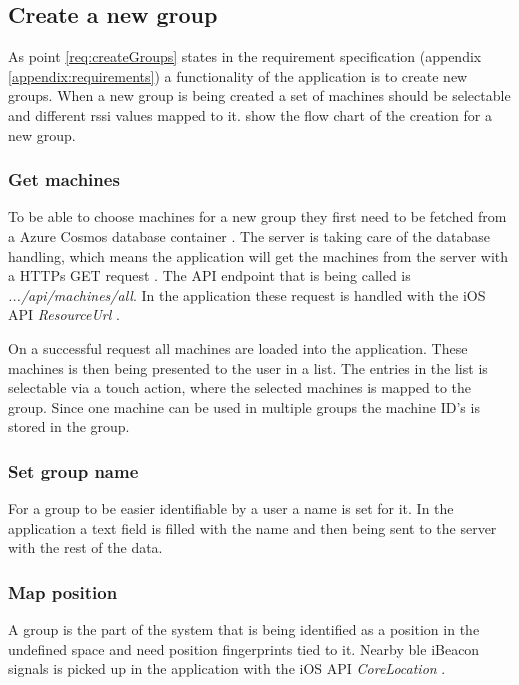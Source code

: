 \subsection{Create a new group}\label{sec:implAppNewGroup}

As point \ref{req:createGroups} states in the requirement specification (appendix \ref{appendix:requirements}) a functionality of the application is to create new groups.
When a new group is being created a set of machines should be selectable and different \acrshort{rssi} values mapped to it.
 show the flow chart of the creation for a new group.


\subsubsection{Get machines}\label{sec:implAppNewGroupGetMachines}
To be able to choose machines for a new group they first need to be fetched from a Azure Cosmos database container \cite{IntroductionAzureCosmos}.
The server is taking care of the database handling, which means the application will get the machines from the server with a HTTPs GET request \cite{GETHTTPMDN}.
The API endpoint that is being called is \textit{.../api/machines/all}.
In the application these request is handled with the iOS API \textit{ResourceUrl} \cite{ResourceURLAppleDeveloper}.

\bigskip

On a successful request all machines are loaded into the application.
These machines is then being presented to the user in a list.
The entries in the list is selectable via a touch action, where the selected machines is mapped to the group.
Since one machine can be used in multiple groups the machine ID's is stored in the group.


\subsubsection{Set group name}\label{sec:implAppNewGroupSetName}
For a group to be easier identifiable by a user a name is set for it.
In the application a text field is filled with the name and then being sent to the server with the rest of the data.


\subsubsection{Map position}\label{sec:implAppNewGroupMapPos}
A group is the part of the system that is being identified as a position in the undefined space and need position fingerprints tied to it.
Nearby \acrshort{ble} iBeacon signals is picked up in the application with the iOS API \textit{CoreLocation} \cite{CoreLocationApple}.

